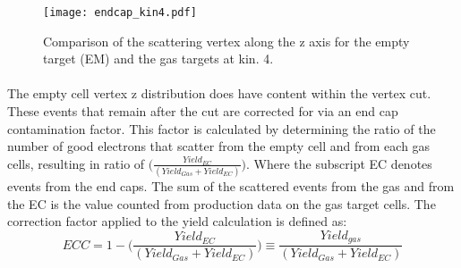 \begin{figure}[]
	\centering

	\texttt{[image: endcap\_kin4.pdf]}

	\caption{Comparison of the scattering vertex along the z axis for the empty target (EM) and the gas targets at kin. 4. }
	\label{EC5}
\end{figure}

\paragraph{}The empty cell vertex z distribution does have content within the vertex cut. These events that remain after the cut are corrected for via an end cap contamination factor. This  factor is calculated by determining the ratio of the number of good electrons that scatter from the empty cell and from each gas cells, resulting in ratio of $\big(\frac{Yield_{EC}}{(Yield_{Gas} + Yield_{EC})}\big)$. Where the subscript EC denotes events from the end caps. The sum of the scattered events from the gas and from the EC is the value counted from production data on the gas target cells. The correction factor applied to the yield calculation is defined as:
\begin{equation*}
ECC = 1- \big(\frac{Yield_{EC}}{(Yield_{Gas} + Yield_{EC})}\big) \equiv \frac{Yield_{gas}}{(Yield_{Gas} + Yield_{EC})}
\end{equation*}





